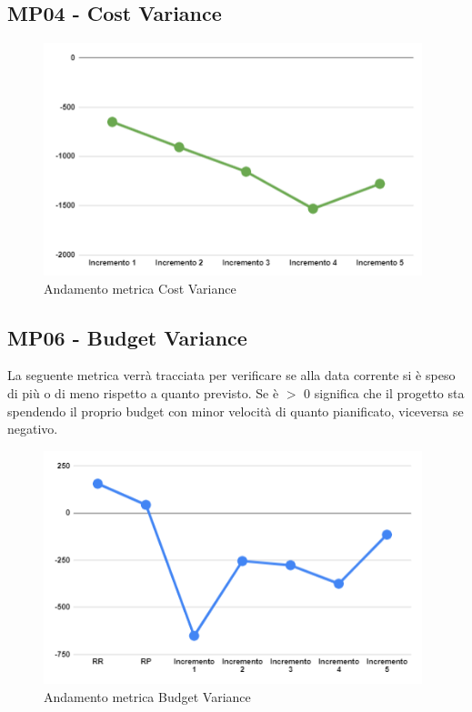 \subsection{MP04 - Cost Variance}

\begin{figure}[H]
	\centering
	\includegraphics[width=11cm]{images/cost_variance.png}
	\caption{Andamento metrica Cost Variance}
\end{figure}

\subsection{MP06 - Budget Variance}
La seguente metrica verrà tracciata per verificare se alla data corrente si è speso di più o di meno rispetto a quanto previsto.
Se è $>$ 0 significa che il progetto sta spendendo il proprio budget con minor velocità di quanto pianificato, viceversa se negativo.
\begin{figure}[H]
	\centering
	\includegraphics[width=11cm]{images/budget_variance.png}
	\caption{Andamento metrica Budget Variance}
\end{figure}

